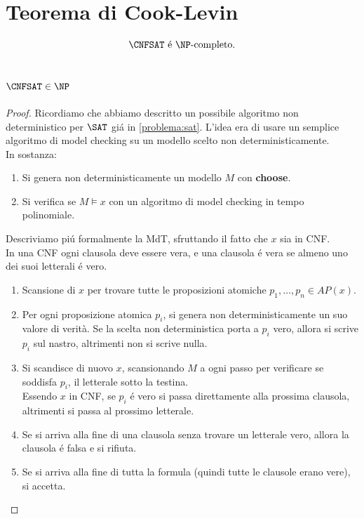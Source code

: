 \section{Teorema di Cook-Levin}
\[\CNFSAT \text{ é } \NP\text{-completo}.\]

\subsection{$\CNFSAT \in \NP$}
\begin{proof}
Ricordiamo che abbiamo descritto un possibile algoritmo non deterministico
per $\SAT$ giá in \ref{problema:sat}. L'idea era di usare un semplice algoritmo
di model checking su un modello scelto non deterministicamente. \\

In sostanza: \begin{enumerate}
\item Si genera non deterministicamente un modello $M$ con \textbf{choose}.
\item Si verifica se $M \models x$ con un algoritmo di model checking in tempo polinomiale.\\
\end{enumerate}

Descriviamo piú formalmente la MdT, sfruttando il fatto che $x$ sia in CNF. \\
In una CNF ogni clausola deve essere vera, e una clausola é vera se almeno uno dei suoi letterali é vero.
\begin{enumerate}
\item Scansione di $x$ per trovare tutte le proposizioni atomiche $p_1, \ldots, p_n \in AP(x)$.
\item Per ogni proposizione atomica $p_i$, si genera non deterministicamente un suo valore di verità. 
Se la scelta non deterministica porta a $p_i$ vero, allora si scrive $p_i$ sul nastro, altrimenti non si scrive nulla.
\item Si scandisce di nuovo $x$, scansionando $M$ a ogni passo per verificare se soddisfa $p_i$, il letterale sotto la testina. \\
    Essendo $x$ in CNF, se $p_i$ é vero si passa direttamente alla prossima clausola, altrimenti si passa al prossimo letterale.
\item Se si arriva alla fine di una clausola senza trovare un letterale vero, allora la clausola é falsa e si rifiuta.
\item Se si arriva alla fine di tutta la formula (quindi tutte le clausole erano vere), si accetta.
\end{enumerate}



\end{proof}
